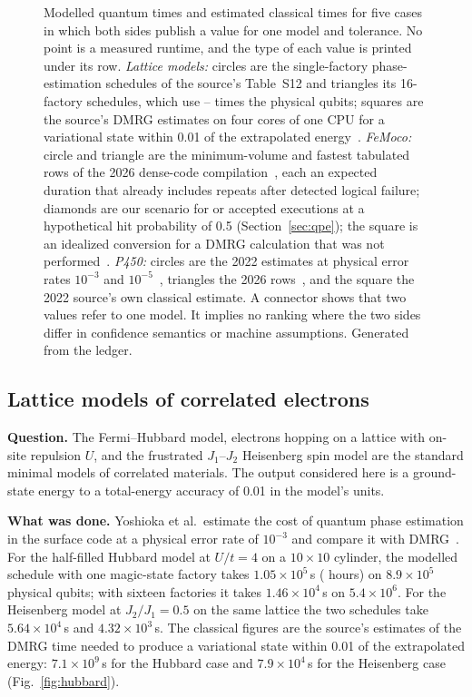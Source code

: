 \documentclass[10pt,a4paper]{article}
\begin{document}
\begin{figure}[htbp]
\caption[Modelled quantum and estimated classical times]{Modelled quantum times and estimated classical times for five cases in which both sides publish a value for one model and tolerance. No point is a measured runtime, and the type of each value is printed under its row. \emph{Lattice models:} circles are the single-factory phase-estimation schedules of the source's Table~S12 and triangles its 16-factory schedules, which use \parQubitLo--\parQubitHi{} times the physical qubits; squares are the source's DMRG estimates on four cores of one CPU for a variational state within 0.01 of the extrapolated energy~\cite{yoshioka2024}. \emph{FeMoco:} circle and triangle are the minimum-volume and fastest tabulated rows of the 2026 dense-code compilation~\cite{low2026dense}, each an expected duration that already includes repeats after detected logical failure; diamonds are our scenario for \repAttempts{} or \repAttemptsSplit{} accepted executions at a hypothetical hit probability of 0.5 (Section~\ref{sec:qpe}); the square is an idealized conversion for a DMRG calculation that was not performed~\cite{zhai2026}. \emph{P450:} circles are the 2022 estimates at physical error rates $10^{-3}$ and $10^{-5}$~\cite{goings2022}, triangles the 2026 rows~\cite{low2026dense}, and the square the 2022 source's own classical estimate. A connector shows that two values refer to one model. It implies no ranking where the two sides differ in confidence semantics or machine assumptions. Generated from the ledger.}
\label{fig:dumbbell}
\end{figure}

\subsection{Lattice models of correlated electrons}
\label{sec:lattice}
\textbf{Question.} The Fermi--Hubbard model, electrons hopping on a lattice with on-site repulsion $U$, and the frustrated $J_1$--$J_2$ Heisenberg spin model are the standard minimal models of correlated materials. The output considered here is a ground-state energy to a total-energy accuracy of 0.01 in the model's units.

\textbf{What was done.} Yoshioka et al.\ estimate the cost of quantum phase estimation in the surface code at a physical error rate of $10^{-3}$ and compare it with DMRG~\cite{yoshioka2024}. For the half-filled Hubbard model at $U/t=4$ on a $10\times10$ cylinder, the modelled schedule with one magic-state factory takes $1.05\times10^5$\,s (\hubTenQh{} hours) on $8.9\times10^5$ physical qubits; with sixteen factories it takes $1.46\times10^4$\,s on $5.4\times10^6$. For the Heisenberg model at $J_2/J_1=0.5$ on the same lattice the two schedules take $5.64\times10^4$\,s and $4.32\times10^3$\,s. The classical figures are the source's estimates of the DMRG time needed to produce a variational state within 0.01 of the extrapolated energy: $7.1\times10^9$\,s for the Hubbard case and $7.9\times10^4$\,s for the Heisenberg case (Fig.~\ref{fig:hubbard}).
\end{document}
